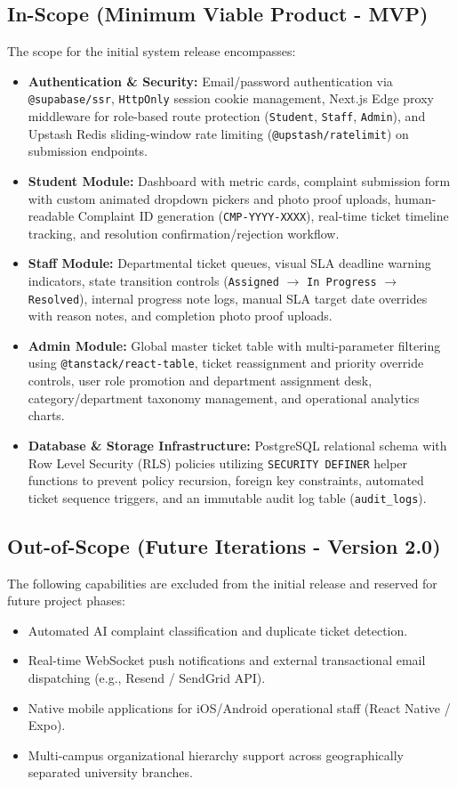 \documentclass[12pt, a4paper]{article}
\begin{document}
\subsection{In-Scope (Minimum Viable Product - MVP)}
The scope for the initial system release encompasses:

\begin{itemize}[leftmargin=*]
    \item \textbf{Authentication \& Security:} Email/password authentication via \texttt{@supabase/ssr}, \texttt{HttpOnly} session cookie management, Next.js Edge proxy middleware for role-based route protection (\texttt{Student}, \texttt{Staff}, \texttt{Admin}), and Upstash Redis sliding-window rate limiting (\texttt{@upstash/ratelimit}) on submission endpoints.
    \item \textbf{Student Module:} Dashboard with metric cards, complaint submission form with custom animated dropdown pickers and photo proof uploads, human-readable Complaint ID generation (\texttt{CMP-YYYY-XXXX}), real-time ticket timeline tracking, and resolution confirmation/rejection workflow.
    \item \textbf{Staff Module:} Departmental ticket queues, visual SLA deadline warning indicators, state transition controls (\texttt{Assigned} $\rightarrow$ \texttt{In Progress} $\rightarrow$ \texttt{Resolved}), internal progress note logs, manual SLA target date overrides with reason notes, and completion photo proof uploads.
    \item \textbf{Admin Module:} Global master ticket table with multi-parameter filtering using \texttt{@tanstack/react-table}, ticket reassignment and priority override controls, user role promotion and department assignment desk, category/department taxonomy management, and operational analytics charts.
    \item \textbf{Database \& Storage Infrastructure:} PostgreSQL relational schema with Row Level Security (RLS) policies utilizing \texttt{SECURITY DEFINER} helper functions to prevent policy recursion, foreign key constraints, automated ticket sequence triggers, and an immutable audit log table (\texttt{audit\_logs}).
\end{itemize}

\subsection{Out-of-Scope (Future Iterations - Version 2.0)}
The following capabilities are excluded from the initial release and reserved for future project phases:
\begin{itemize}[leftmargin=*]
    \item Automated AI complaint classification and duplicate ticket detection.
    \item Real-time WebSocket push notifications and external transactional email dispatching (e.g., Resend / SendGrid API).
    \item Native mobile applications for iOS/Android operational staff (React Native / Expo).
    \item Multi-campus organizational hierarchy support across geographically separated university branches.
\end{itemize}
\end{document}
